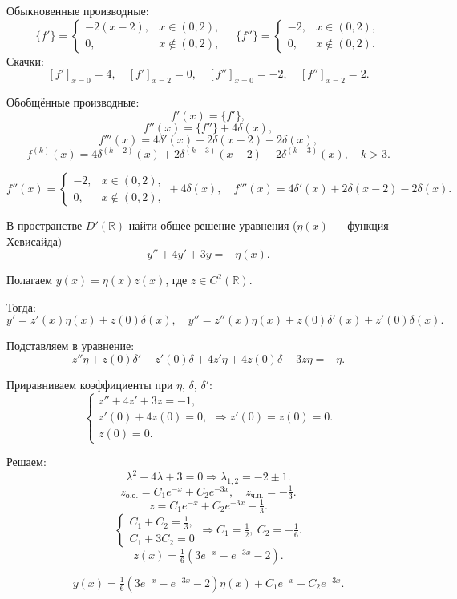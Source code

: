 \begin{sol}
	Обыкновенные производные:
	\[
		\{f'\}=
		\begin{cases}
			-2(x-2), & x\in(0,2),    \\
			0,       & x\notin(0,2),
		\end{cases}
		\quad
		\{f''\}=
		\begin{cases}
			-2, & x\in(0,2),    \\
			0,  & x\notin(0,2).
		\end{cases}
	\]
	Скачки:
	\[
		[f']_{x=0}=4,\quad [f']_{x=2}=0,\quad [f'']_{x=0}=-2,\quad [f'']_{x=2}=2.
	\]

	Обобщённые производные:
	\[
		f'(x)=\{f'\},
	\]
	\[
		f''(x)=\{f''\}+4\delta(x),
	\]
	\[
		f'''(x)=4\delta'(x)+2\delta(x-2)-2\delta(x),
	\]
	\[
		f^{(k)}(x)=4\delta^{(k-2)}(x)+2\delta^{(k-3)}(x-2)-2\delta^{(k-3)}(x),\quad k>3.
	\]
\end{sol}

\begin{out}
	\[
		\boxed{
			f''(x)=
			\begin{cases}
				-2, & x\in(0,2),    \\
				0,  & x\notin(0,2),
			\end{cases}
			+4\delta(x),\quad
			f'''(x)=4\delta'(x)+2\delta(x-2)-2\delta(x).
		}
	\]
\end{out}


\begin{cond}
	В пространстве $D'(\mathbb{R})$ найти общее решение уравнения ($\eta(x)$ — функция Хевисайда)
	\[
		y'' + 4y' + 3y = -\eta(x).
	\]
\end{cond}

\begin{sol}
	Полагаем $y(x)=\eta(x)z(x)$, где $z\in C^2(\mathbb{R})$.

	Тогда:
	\[
		y' = z'(x)\eta(x)+z(0)\delta(x),
		\quad
		y'' = z''(x)\eta(x)+z(0)\delta'(x)+z'(0)\delta(x).
	\]

	Подставляем в уравнение:
	\[
		z''\eta+z(0)\delta'+z'(0)\delta+4z'\eta+4z(0)\delta+3z\eta=-\eta.
	\]

	Приравниваем коэффициенты при $\eta$, $\delta$, $\delta'$:
	\[
		\begin{cases}
			z''+4z'+3z=-1, \\
			z'(0)+4z(0)=0, \\
			z(0)=0.
		\end{cases}
		\Rightarrow z'(0)=z(0)=0.
	\]

	Решаем:
	\[
		\lambda^2+4\lambda+3=0 \Rightarrow \lambda_{1,2}=-2\pm1.
	\]
	\[
		z_{о.о.}=C_1e^{-x}+C_2e^{-3x},\quad z_{ч.н.}=-\tfrac{1}{3}.
	\]
	\[
		z=C_1e^{-x}+C_2e^{-3x}-\tfrac{1}{3}.
	\]
	\[
		\begin{cases}
			C_1+C_2=\tfrac{1}{3}, \\
			C_1+3C_2=0
		\end{cases}
		\Rightarrow
		C_1=\tfrac{1}{2},\ C_2=-\tfrac{1}{6}.
	\]
	\[
		z(x)=\tfrac{1}{6}(3e^{-x}-e^{-3x}-2).
	\]
\end{sol}

\begin{out}
	\[
		y(x)=\tfrac{1}{6}(3e^{-x}-e^{-3x}-2)\eta(x)+C_1e^{-x}+C_2e^{-3x}.
	\]
\end{out}
